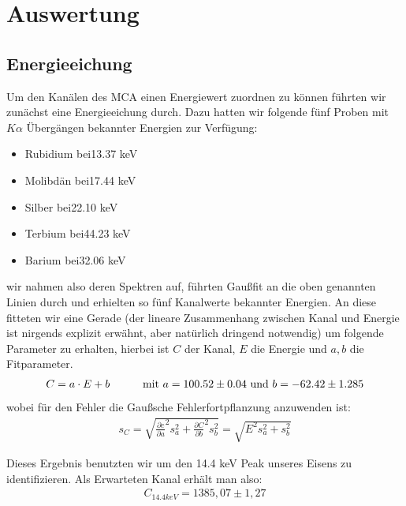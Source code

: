\documentclass[12pt]{article}
\begin{document}
\section{Auswertung}
\subsection{Energieeichung}

Um den Kanälen des MCA einen Energiewert zuordnen zu können führten wir zunächst eine Energieeichung durch. Dazu hatten wir folgende fünf Proben mit $K\alpha$ Übergängen
bekannter Energien zur Verfügung:
\begin{itemize}
 \item Rubidium bei\hspace{30pt}13.37 keV
 \item Molibdän bei\hspace{30pt}17.44 keV
 \item Silber	bei\hspace{30pt}22.10 keV
 \item Terbium  bei\hspace{30pt}44.23 keV
 \item Barium   bei\hspace{30pt}32.06 keV
\end{itemize}

wir nahmen also deren Spektren auf, führten Gaußfit an die oben genannten Linien durch und erhielten so fünf Kanalwerte bekannter Energien. An diese fitteten 
wir eine Gerade (der lineare Zusammenhang zwischen Kanal und Energie ist nirgends explizit erwähnt, aber natürlich dringend notwendig) um folgende Parameter
zu erhalten, hierbei ist $C$ der Kanal, $E$ die Energie und $a,b$ die Fitparameter.
\begin{align*}
  C = a \cdot E + b \hspace{30pt} \textnormal{mit }a = 100.52 \pm 0.04\textnormal{ und }b =  -62.42 \pm 1.285
\end{align*}
wobei für den Fehler die Gaußsche Fehlerfortpflanzung anzuwenden ist:
\begin{align*}
  s_C = \sqrt{\frac{\partial{c}}{\partial{a}}^2 s_a^2 + \frac{\partial{C}}{\partial{b}}^2 s_b^2 } = \sqrt{E^2 s_a^2 + s_b^2}
\end{align*}

Dieses Ergebnis benutzten wir um den 14.4 keV Peak unseres Eisens zu identifizieren. Als Erwarteten Kanal erhält man also:
\begin{align*}
  C_{14.4keV} = 1385,07 \pm 1,27
\end{align*}
\end{document}
